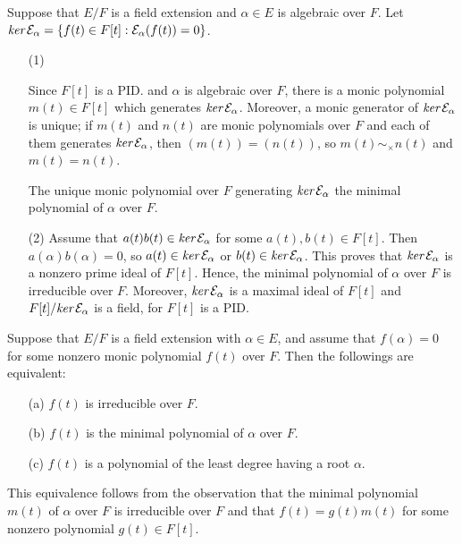 \begin{obs}\label{min.poly}
    Suppose that $E/F$ is a field extension and $\alpha\in E$ is algebraic over $F$.
    Let $\textit{ker\,}{\mathcal{E}}_\alpha=\{f(t)\in F[t]: {\mathcal{E}}_\alpha(f(t))=0\}$.
    \begin{enumerate}
        \item[(1)]
        {
            Since $F[t]$ is a PID. and $\alpha$ is algebraic over $F$, there is a monic polynomial $m(t)\in F[t]$ which generates $\textit{ker\,}{\mathcal{E}}_\alpha$.
            Moreover, a monic generator of $\textit{ker\,}{\mathcal{E}}_\alpha$ is unique; if $m(t)$ and $n(t)$ are monic polynomials over $F$ and each of them generates $\textit{ker\,}{\mathcal{E}}_\alpha$, then $(m(t))=(n(t))$, so $m(t)\sim_\times n(t)$ and $m(t)=n(t)$.
            \begin{defi}
                The unique monic polynomial over $F$ generating $\textit{ker\,}{\mathcal{E}}_\alpha$ the minimal polynomial of $\alpha$ over $F$.
            \end{defi}
        }
        \item[(2)]
        {
            Assume that $a(t)b(t)\in \textit{ker\,}{\mathcal{E}}_\alpha$ for some $a(t), b(t)\in F[t]$.
            Then $a(\alpha)b(\alpha)=0$, so $a(t)\in \textit{ker\,}{\mathcal{E}}_\alpha$ or $b(t)\in \textit{ker\,}{\mathcal{E}}_\alpha$.
            This proves that $\textit{ker\,}{\mathcal{E}}_\alpha$ is a nonzero prime ideal of $F[t]$.
            Hence, the minimal polynomial of $\alpha$ over $F$ is irreducible over $F$.
            Moreover, $\textit{ker\,}{\mathcal{E}}_\alpha$ is a maximal ideal of $F[t]$ and $F[t]/\textit{ker\,}{\mathcal{E}}_\alpha$ is a field, for $F[t]$ is a PID.
        }
    \end{enumerate}

    Suppose that $E/F$ is a field extension with $\alpha\in E$, and assume that $f(\alpha)=0$ for some nonzero monic polynomial $f(t)$ over $F$.
    Then the followings are equivalent:
    \begin{enumerate}
        \item[(a)]
        {
            $f(t)$ is irreducible over $F$.
        }
        \item[(b)]
        {
            $f(t)$ is the minimal polynomial of $\alpha$ over $F$.
        }
        \item[(c)]
        {
            $f(t)$ is a polynomial of the least degree having a root $\alpha$.
        }
    \end{enumerate}
    This equivalence follows from the observation that the minimal polynomial $m(t)$ of $\alpha$ over $F$ is irreducible over $F$ and that $f(t)=g(t)m(t)$ for some nonzero polynomial $g(t)\in F[t]$.
\end{obs}
